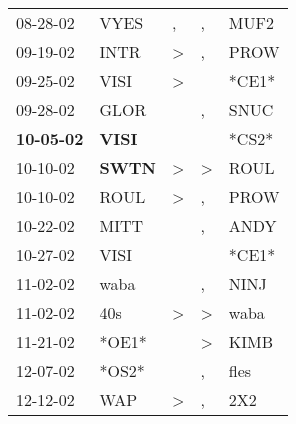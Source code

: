 \begin{supertabular}{p{0.07\textwidth}p{0.06\textwidth}p{0.02\textwidth}p{0.02\textwidth}p{0.06\textwidth}}
          08-28-02\textsuperscript{} &           VYES\textsuperscript{} &                , &                , &           MUF2\textsuperscript{} \\
          09-19-02\textsuperscript{} &           INTR\textsuperscript{} &     \textgreater &                , &           PROW\textsuperscript{} \\
          09-25-02\textsuperscript{} &           VISI\textsuperscript{} &     \textgreater &                  &                            *CE1* \\
          09-28-02\textsuperscript{} &           GLOR\textsuperscript{} &                  &                , &           SNUC\textsuperscript{} \\
 \textbf{10-05-02\textsuperscript{}} &  \textbf{VISI\textsuperscript{}} &                  &                  &                            *CS2* \\
          10-10-02\textsuperscript{} &  \textbf{SWTN\textsuperscript{}} &     \textgreater &     \textgreater &           ROUL\textsuperscript{} \\
          10-10-02\textsuperscript{} &           ROUL\textsuperscript{} &     \textgreater &                , &           PROW\textsuperscript{} \\
          10-22-02\textsuperscript{} &           MITT\textsuperscript{} &                  &                , &           ANDY\textsuperscript{} \\
          10-27-02\textsuperscript{} &           VISI\textsuperscript{} &                  &                  &                            *CE1* \\
          11-02-02\textsuperscript{} &           waba\textsuperscript{} &                  &                , &           NINJ\textsuperscript{} \\
          11-02-02\textsuperscript{} &            40s\textsuperscript{} &     \textgreater &     \textgreater &           waba\textsuperscript{} \\
          11-21-02\textsuperscript{} &                            *OE1* &                  &     \textgreater &           KIMB\textsuperscript{} \\
          12-07-02\textsuperscript{} &                            *OS2* &                  &                , &           fles\textsuperscript{} \\
          12-12-02\textsuperscript{} &            WAP\textsuperscript{} &     \textgreater &                , &            2X2\textsuperscript{} \\

\end{supertabular}
